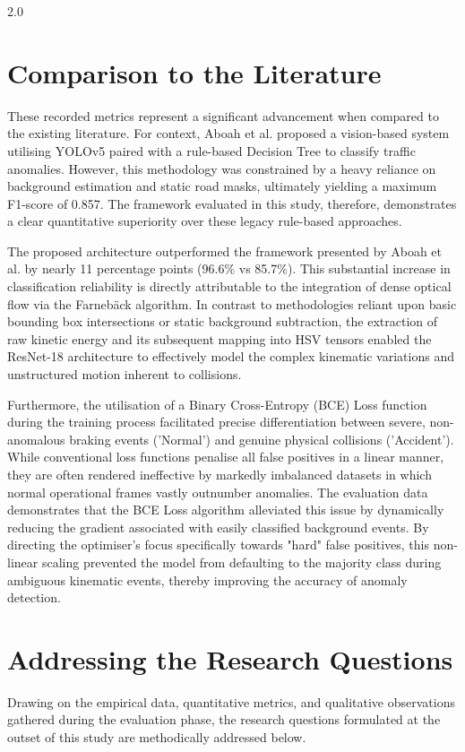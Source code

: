 \begin{spacing}{2.0}
\section{Comparison to the Literature}
These recorded metrics represent a significant advancement when compared to the existing literature. For context, Aboah et al. \cite{aboah_vision-based_2021} proposed a vision-based system utilising YOLOv5 paired with a rule-based Decision Tree to classify traffic anomalies. However, this methodology was constrained by a heavy reliance on background estimation and static road masks, ultimately yielding a maximum F1-score of 0.857. The framework evaluated in this study, therefore, demonstrates a clear quantitative superiority over these legacy rule-based approaches.

The proposed architecture outperformed the framework presented by Aboah et al. \cite{aboah_vision-based_2021} by nearly 11 percentage points (96.6\% vs 85.7\%). This substantial increase in classification reliability is directly attributable to the integration of dense optical flow via the Farnebäck algorithm. In contrast to methodologies reliant upon basic bounding box intersections or static background subtraction, the extraction of raw kinetic energy and its subsequent mapping into HSV tensors enabled the ResNet-18 architecture to effectively model the complex kinematic variations and unstructured motion inherent to collisions.

Furthermore, the utilisation of a Binary Cross-Entropy (BCE) Loss function during the training process facilitated precise differentiation between severe, non-anomalous braking events ('Normal') and genuine physical collisions ('Accident'). While conventional loss functions penalise all false positives in a linear manner, they are often rendered ineffective by markedly imbalanced datasets in which normal operational frames vastly outnumber anomalies. The evaluation data demonstrates that the BCE Loss algorithm alleviated this issue by dynamically reducing the gradient associated with easily classified background events. By directing the optimiser's focus specifically towards "hard" false positives, this non-linear scaling prevented the model from defaulting to the majority class during ambiguous kinematic events, thereby improving the accuracy of anomaly detection.

\section{Addressing the Research Questions}
Drawing on the empirical data, quantitative metrics, and qualitative observations gathered during the evaluation phase, the research questions formulated at the outset of this study are methodically addressed below.


\end{spacing}

